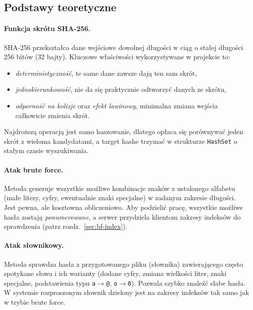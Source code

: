 \documentclass[11pt,a4paper]{article}
\begin{document}
\subsection{Podstawy teoretyczne}

\paragraph{Funkcja skrótu SHA-256.}
SHA-256 przekształca dane wejściowe dowolnej długości w ciąg o stałej długości 256 bitów
(32 bajty). Kluczowe właściwości wykorzystywane w projekcie to:
\begin{itemize}
  \item \emph{deterministyczność}, te same dane zawsze dają ten sam skrót,
  \item \emph{jednokierunkowość}, nie da się praktycznie odtworzyć danych ze skrótu,
  \item \emph{odporność na kolizje} oraz \emph{efekt lawinowy}, minimalna zmiana wejścia
        całkowicie zmienia skrót.
\end{itemize}
Najdroższą operacją jest samo haszowanie, dlatego opłaca się porównywać jeden skrót z wieloma
kandydatami, a target hashe trzymać w strukturze \texttt{HashSet} o stałym czasie wyszukiwania.

\paragraph{Atak brute force.}
Metoda generuje wszystkie możliwe kombinacje znaków z ustalonego alfabetu (małe litery,
cyfry, ewentualnie znaki specjalne) w zadanym zakresie długości. Jest pewna, ale kosztowna
obliczeniowo. Aby podzielić pracę, wszystkie możliwe hasła zostają \emph{ponumerowane}, a serwer
przydziela klientom zakresy indeksów do sprawdzenia (patrz rozdz.~\ref{sec:bf-index}).

\paragraph{Atak słownikowy.}
Metoda sprawdza hasła z przygotowanego pliku (słownika) zawierającego często spotykane słowa i
ich warianty (dodane cyfry, zmiana wielkości liter, znaki specjalne, podstawienia typu
\texttt{a}$\rightarrow$\texttt{@}, \texttt{o}$\rightarrow$\texttt{0}). Pozwala szybko znaleźć słabe
hasła. W systemie rozproszonym słownik dzielony jest na zakresy indeksów tak samo jak w trybie
brute force.

\end{document}
